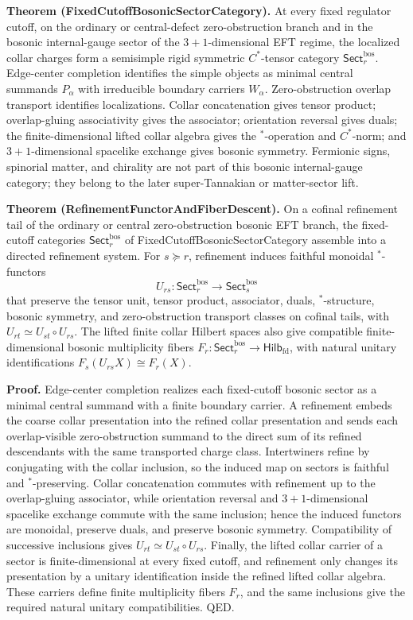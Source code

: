 \textbf{Theorem (FixedCutoffBosonicSectorCategory).} At every fixed regulator cutoff, on the ordinary or central-defect zero-obstruction branch and in the bosonic internal-gauge sector of the \(3+1\)-dimensional EFT regime, the localized collar charges form a semisimple rigid symmetric \(C^*\)-tensor category \(\mathsf{Sect}^{\mathrm{bos}}_r\). Edge-center completion identifies the simple objects as minimal central summands \(P_\alpha\) with irreducible boundary carriers \(W_\alpha\). Zero-obstruction overlap transport identifies localizations. Collar concatenation gives tensor product; overlap-gluing associativity gives the associator; orientation reversal gives duals; the finite-dimensional lifted collar algebra gives the \(^*\)-operation and \(C^*\)-norm; and \(3+1\)-dimensional spacelike exchange gives bosonic symmetry. Fermionic signs, spinorial matter, and chirality are not part of this bosonic internal-gauge category; they belong to the later super-Tannakian or matter-sector lift.

\textbf{Theorem (RefinementFunctorAndFiberDescent).} On a cofinal refinement tail of the ordinary or central zero-obstruction bosonic EFT branch, the fixed-cutoff categories \(\mathsf{Sect}^{\mathrm{bos}}_r\) of FixedCutoffBosonicSectorCategory assemble into a directed refinement system. For \(s\succeq r\), refinement induces faithful monoidal \(^*\)-functors
\[
U_{rs}:\mathsf{Sect}^{\mathrm{bos}}_r\to\mathsf{Sect}^{\mathrm{bos}}_s
\]
that preserve the tensor unit, tensor product, associator, duals, \(^*\)-structure, bosonic symmetry, and zero-obstruction transport classes on cofinal tails, with \(U_{rt}\simeq U_{st}\circ U_{rs}\). The lifted finite collar Hilbert spaces also give compatible finite-dimensional bosonic multiplicity fibers \(F_r:\mathsf{Sect}^{\mathrm{bos}}_r\to\mathsf{Hilb}_{\mathrm{fd}}\), with natural unitary identifications \(F_s(U_{rs}X)\cong F_r(X)\).

\textbf{Proof.} Edge-center completion realizes each fixed-cutoff bosonic sector as a minimal central summand with a finite boundary carrier. A refinement embeds the coarse collar presentation into the refined collar presentation and sends each overlap-visible zero-obstruction summand to the direct sum of its refined descendants with the same transported charge class. Intertwiners refine by conjugating with the collar inclusion, so the induced map on sectors is faithful and \(^*\)-preserving. Collar concatenation commutes with refinement up to the overlap-gluing associator, while orientation reversal and \(3+1\)-dimensional spacelike exchange commute with the same inclusion; hence the induced functors are monoidal, preserve duals, and preserve bosonic symmetry. Compatibility of successive inclusions gives \(U_{rt}\simeq U_{st}\circ U_{rs}\). Finally, the lifted collar carrier of a sector is finite-dimensional at every fixed cutoff, and refinement only changes its presentation by a unitary identification inside the refined lifted collar algebra. These carriers define finite multiplicity fibers \(F_r\), and the same inclusions give the required natural unitary compatibilities. QED.

